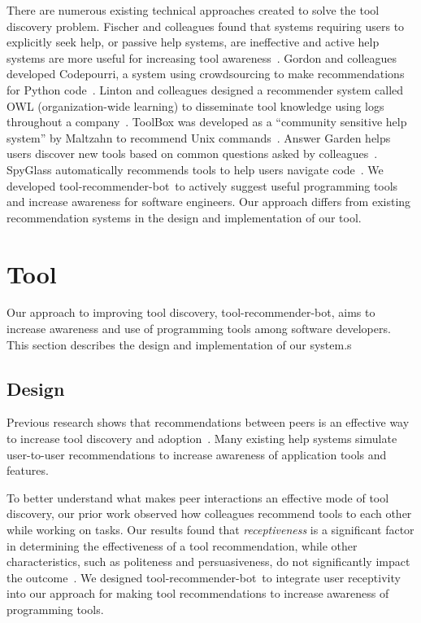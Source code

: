 \documentclass[conference]{IEEEtran}
\newcommand{\tool}{tool-recommender-bot}
\begin{document}
There are numerous existing technical approaches created to solve the tool discovery problem. Fischer and colleagues found that systems requiring users to explicitly seek help, or passive help systems, are ineffective and active help systems are more useful for increasing tool awareness~\cite{Fischer1984ActiveHelpSystems}. Gordon and colleagues developed Codepourri, a system using crowdsourcing to make recommendations for Python code~\cite{Gordon2015Codepourri}. Linton and colleagues designed a recommender system called OWL (organization-wide learning) to disseminate tool knowledge using logs throughout a company~\cite{Linton2000OWL}. ToolBox was developed as a ``community sensitive help system'' by Maltzahn to recommend Unix commands~\cite{Maltzahn1995Toolbox}. Answer Garden helps users discover new tools based on common questions asked by colleagues~\cite{Ackerman1990AnswerGarden}. SpyGlass automatically recommends tools to help users navigate code~\cite{Viriyakattiyaporn2010Spyglass}. We developed \tool~to actively suggest useful programming tools and increase awareness for software engineers. Our approach differs from existing recommendation systems in the design and implementation of our tool.

\section{Tool}
Our approach to improving tool discovery, \tool, aims to increase awareness and use of programming tools among software developers. This section describes the design and implementation of our system.s

\subsection{Design}
Previous research shows that recommendations between peers is an effective way to increase tool discovery and adoption~\cite{MurphyHill2011PeerInteraction}. Many existing help systems simulate user-to-user recommendations to increase awareness of application tools and features. 

To better understand what makes peer interactions an effective mode of tool discovery, our prior work observed how colleagues recommend tools to each other while working on tasks. Our results found that \emph{receptiveness} is a significant factor in determining the effectiveness of a tool recommendation, while other characteristics, such as politeness and persuasiveness, do not significantly impact the outcome~\cite{vlhcc17}. We designed \tool~to integrate user receptivity into our approach for making tool recommendations to increase awareness of programming tools.
\end{document}
